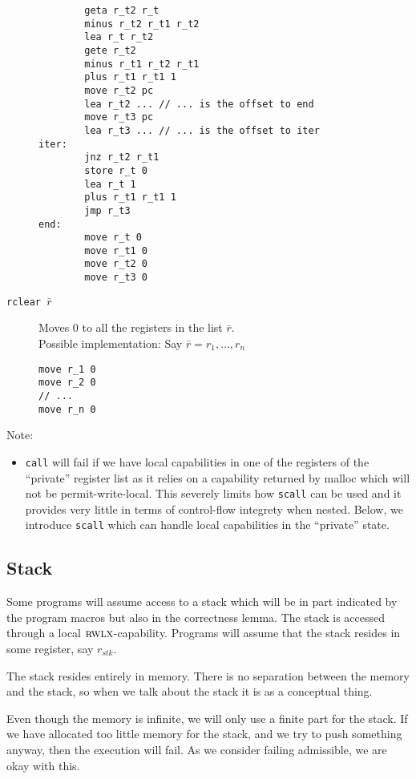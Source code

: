 \documentclass[a4paper]{article}
\newcommand{\var}[1]{\mathit{#1}}
\newcommand{\plainperm}[1]{\textsc{#1}}
\newcommand{\rwlx}{\plainperm{rwlx}}
\begin{document}
\begin{description}
\begin{lstlisting}
        geta r_t2 r_t
        minus r_t2 r_t1 r_t2
        lea r_t r_t2
        gete r_t2
        minus r_t1 r_t2 r_t1
        plus r_t1 r_t1 1
        move r_t2 pc
        lea r_t2 ... // ... is the offset to end
        move r_t3 pc
        lea r_t3 ... // ... is the offset to iter
iter:
        jnz r_t2 r_t1
        store r_t 0
        lea r_t 1
        plus r_t1 r_t1 1
        jmp r_t3
end:
        move r_t 0
        move r_t1 0
        move r_t2 0
        move r_t3 0
\end{lstlisting}
              \item[\texttt{rclear $\bar{r}$}] Moves 0 to all the registers in the list $\bar{r}$.\\
Possible implementation: Say $\bar{r} = r_1,\dots, r_n$
\begin{lstlisting}
move r_1 0
move r_2 0
// ...
move r_n 0
\end{lstlisting}

\end{description}
Note:
\begin{itemize}
\item \texttt{call} will fail if we have local capabilities in one of the registers of the ``private'' register list as it relies on a capability returned by malloc which will not be permit-write-local. This severely limits how \texttt{scall} can be used and it provides very little in terms of control-flow integrety when nested. Below, we introduce \texttt{scall} which can handle local capabilities in the ``private'' state. 
\end{itemize}
\subsection{Stack}
Some programs will assume access to a stack which will be in part indicated by the program macros but also in the correctness lemma. The stack is accessed through a local $\rwlx$-capability. Programs will assume that the stack resides in some register, say $r_{\var{stk}}$.

The stack resides entirely in memory. There is no separation between the memory and the stack, so when we talk about the stack it is as a conceptual thing. %

Even though the memory is infinite, we will only use a finite part for the stack. If we have allocated too little memory for the stack, and we try to push something anyway, then the execution will fail. As we consider failing admissible, we are okay with this. 
\end{document}
